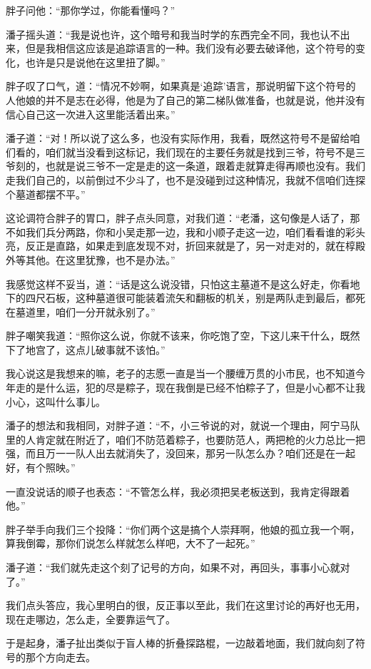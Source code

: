 胖子问他：“那你学过，你能看懂吗？”

潘子摇头道：“我是说也许，这个暗号和我当时学的东西完全不同，我也认不出来，但是我相信这应该是追踪语言的一种。我们没有必要去破译他，这个符号的变化，也许是只是说他在这里扭了脚。”

胖子叹了口气，道：“情况不妙啊，如果真是‘追踪’语言，那说明留下这个符号的人他娘的并不是志在必得，他是为了自己的第二梯队做准备，也就是说，他并没有信心自己这一次进入这里能活着出来。”

潘子道：“对！所以说了这么多，也没有实际作用，我看，既然这符号不是留给咱们看的，咱们就当没看到这标记，我们现在的主要任务就是找到三爷，符号不是三爷刻的，也就是说三爷不一定是走的这一条道，跟着走就算走得再顺也没有。我们走我们自己的，以前倒过不少斗了，也不是没碰到过这种情况，我就不信咱们连探个墓道都摆不平。”

这论调符合胖子的胃口，胖子点头同意，对我们道：“老潘，这句像是人话了，那不如我们兵分两路，你和小吴走那一边，我和小顺子走这一边，咱们看看谁的彩头亮，反正是直路，如果走到底发现不对，折回来就是了，另一对走对的，就在椁殿外等其他。在这里犹豫，也不是办法。”

我感觉这样不妥当，道：“话是这么说没错，只怕这主墓道不是这么好走，你看地下的四尺石板，这种墓道很可能装着流矢和翻板的机关，别是两队走到最后，都死在墓道里，咱们一分开就永别了。”

胖子嘲笑我道：“照你这么说，你就不该来，你吃饱了空，下这儿来干什么，既然下了地宫了，这点儿破事就不该怕。”

我心说这是我想来的嘛，老子的志愿一直是当一个腰缠万贯的小市民，也不知道今年走的是什么运，犯的尽是粽子，现在我倒是已经不怕粽子了，但是小心都不让我小心，这叫什么事儿。

潘子的想法和我相同，对胖子道：“不，小三爷说的对，就说一个理由，阿宁马队里的人肯定就在附近了，咱们不防范着粽子，也要防范人，两把枪的火力总比一把强，而且万一一队人出去就消失了，没回来，那另一队怎么办？咱们还是在一起好，有个照映。”

一直没说话的顺子也表态：“不管怎么样，我必须把吴老板送到，我肯定得跟着他。”

胖子举手向我们三个投降：“你们两个这是搞个人崇拜啊，他娘的孤立我一个啊，算我倒霉，那你们说怎么样就怎么样吧，大不了一起死。”

潘子道：“我们就先走这个刻了记号的方向，如果不对，再回头，事事小心就对了。”

我们点头答应，我心里明白的很，反正事以至此，我们在这里讨论的再好也无用，现在走哪边，怎么走，全要靠运气了。

于是起身，潘子扯出类似于盲人棒的折叠探路棍，一边敲着地面，我们就向刻了符号的那个方向走去。

